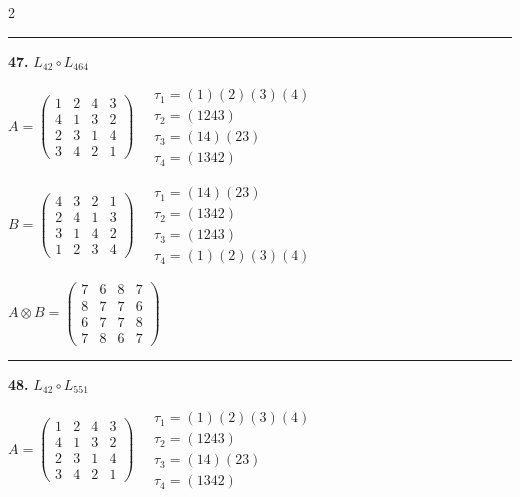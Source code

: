 \begin{multicols}{2}
\vspace{0.3em}
\hrule
\vspace{0.3em}

\noindent\textbf{47.} $L_{42} \circ L_{464}$

$A = \begin{pmatrix} 1 & 2 & 4 & 3 \\ 4 & 1 & 3 & 2 \\ 2 & 3 & 1 & 4 \\ 3 & 4 & 2 & 1 \end{pmatrix} \quad \begin{matrix} \tau_{1}=(1)(2)(3)(4) \\ \tau_{2}=(1 2 4 3) \\ \tau_{3}=(1 4)(2 3) \\ \tau_{4}=(1 3 4 2) \end{matrix}$

$B = \begin{pmatrix} 4 & 3 & 2 & 1 \\ 2 & 4 & 1 & 3 \\ 3 & 1 & 4 & 2 \\ 1 & 2 & 3 & 4 \end{pmatrix} \quad \begin{matrix} \tau_{1}=(1 4)(2 3) \\ \tau_{2}=(1 3 4 2) \\ \tau_{3}=(1 2 4 3) \\ \tau_{4}=(1)(2)(3)(4) \end{matrix}$

$A \otimes B = \begin{pmatrix} 7 & 6 & 8 & 7 \\ 8 & 7 & 7 & 6 \\ 6 & 7 & 7 & 8 \\ 7 & 8 & 6 & 7 \end{pmatrix}$

\vspace{0.3em}
\hrule
\vspace{0.3em}

\noindent\textbf{48.} $L_{42} \circ L_{551}$

$A = \begin{pmatrix} 1 & 2 & 4 & 3 \\ 4 & 1 & 3 & 2 \\ 2 & 3 & 1 & 4 \\ 3 & 4 & 2 & 1 \end{pmatrix} \quad \begin{matrix} \tau_{1}=(1)(2)(3)(4) \\ \tau_{2}=(1 2 4 3) \\ \tau_{3}=(1 4)(2 3) \\ \tau_{4}=(1 3 4 2) \end{matrix}$


\end{multicols}
